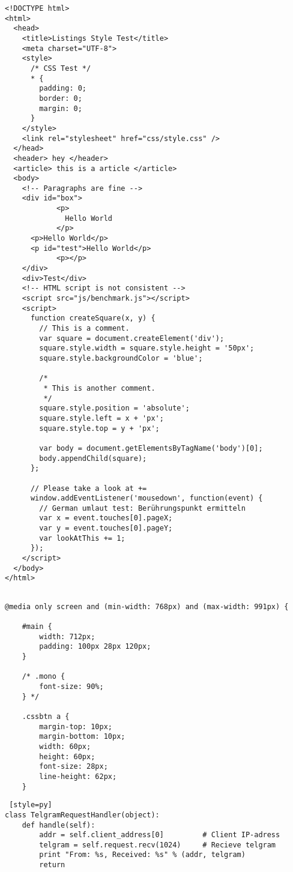 \documentclass{scrreprt}
\begin{document}
\begin{lstlisting}[style=htmlcssjs]
<!DOCTYPE html>
<html>
  <head>
    <title>Listings Style Test</title>
    <meta charset="UTF-8">
    <style>
      /* CSS Test */
      * {
        padding: 0;
        border: 0;
        margin: 0;
      }
    </style>
    <link rel="stylesheet" href="css/style.css" />
  </head>
  <header> hey </header>
  <article> this is a article </article>
  <body>
    <!-- Paragraphs are fine -->
    <div id="box">			
			<p>
			  Hello World
			</p>
      <p>Hello World</p>
      <p id="test">Hello World</p>
			<p></p>
    </div>
    <div>Test</div>
    <!-- HTML script is not consistent -->
    <script src="js/benchmark.js"></script>
    <script>
      function createSquare(x, y) {
        // This is a comment.
        var square = document.createElement('div');
        square.style.width = square.style.height = '50px';
        square.style.backgroundColor = 'blue';
        
        /*
         * This is another comment.
         */
        square.style.position = 'absolute';
        square.style.left = x + 'px'; 
        square.style.top = y + 'px';
        
        var body = document.getElementsByTagName('body')[0];
        body.appendChild(square);
      };
      
      // Please take a look at +=
      window.addEventListener('mousedown', function(event) {
        // German umlaut test: Berührungspunkt ermitteln
        var x = event.touches[0].pageX;
        var y = event.touches[0].pageY;
        var lookAtThis += 1;
      });
    </script>
  </body>
</html>
\end{lstlisting}

\begin{lstlisting}[style=htmlcssjs]

@media only screen and (min-width: 768px) and (max-width: 991px) {
	
	#main {
		width: 712px;
		padding: 100px 28px 120px;
	}
	
	/* .mono {
		font-size: 90%;
	} */
	
	.cssbtn a {
		margin-top: 10px;
		margin-bottom: 10px;
		width: 60px;  
		height: 60px;   
		font-size: 28px;
		line-height: 62px;
	}
\end{lstlisting}

\begin{lstlisting} [style=py]
class TelgramRequestHandler(object):
    def handle(self):
        addr = self.client_address[0]         # Client IP-adress
        telgram = self.request.recv(1024)     # Recieve telgram
        print "From: %s, Received: %s" % (addr, telgram)
        return
\end{lstlisting}
\end{document}
